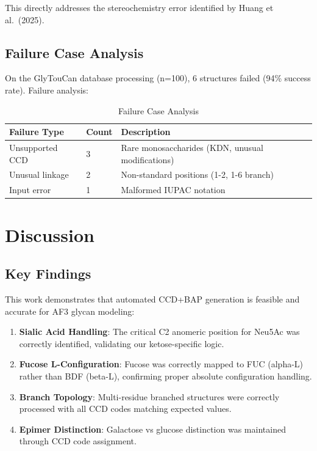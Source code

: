 \documentclass[11pt,a4paper]{article}
\begin{document}
This directly addresses the stereochemistry error identified by Huang et al.\ (2025).

\subsection{Failure Case Analysis}

On the GlyTouCan database processing (n=100), 6 structures failed (94\% success rate). Failure analysis:

\begin{table}[h]
\centering
\caption{Failure Case Analysis}
\begin{tabular}{lll}
\toprule
Failure Type & Count & Description \\
\midrule
Unsupported CCD & 3 & Rare monosaccharides (KDN, unusual modifications) \\
Unusual linkage & 2 & Non-standard positions (1-2, 1-6 branch) \\
Input error & 1 & Malformed IUPAC notation \\
\bottomrule
\end{tabular}
\label{tab:failures}
\end{table}%
\section{Discussion}

\subsection{Key Findings}

This work demonstrates that automated CCD+BAP generation is feasible and accurate for AF3 glycan modeling:

\begin{enumerate}
\item \textbf{Sialic Acid Handling}: The critical C2 anomeric position for Neu5Ac was correctly identified, validating our ketose-specific logic.

\item \textbf{Fucose L-Configuration}: Fucose was correctly mapped to FUC (alpha-L) rather than BDF (beta-L), confirming proper absolute configuration handling.

\item \textbf{Branch Topology}: Multi-residue branched structures were correctly processed with all CCD codes matching expected values.

\item \textbf{Epimer Distinction}: Galactose vs glucose distinction was maintained through CCD code assignment.
\end{enumerate}
\end{document}
